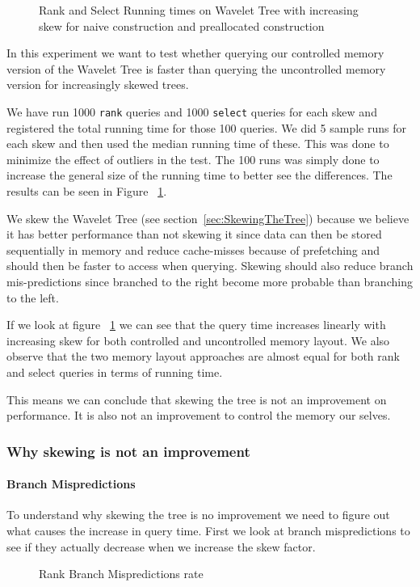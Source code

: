 \begin{figure}
\caption{Rank and Select Running times on Wavelet Tree with increasing skew for naive construction and preallocated construction}
\label{fig:NaiveRankSelectSkewRunningTime}

\end{figure}


In this experiment we want to test whether querying our controlled memory version of the Wavelet Tree is faster than querying the uncontrolled memory version for increasingly skewed trees. 

We have run 1000 \texttt{rank} queries and 1000 \texttt{select} queries for each skew and registered the total running time for those 100 queries. 
We did 5 sample runs for each skew and then used the median running time of these. 
This was done to minimize the effect of outliers in the test. The 100 runs was simply done to increase the general size of the running time to better see the differences. The results can be seen in Figure ~\ref{fig:NaiveRankSelectSkewRunningTime}.

We skew the Wavelet Tree (see section~\ref{sec:SkewingTheTree}) because we believe it has better performance than not skewing it since data can then be stored sequentially in memory and reduce cache-misses because of prefetching and should then be faster to access when querying. 
Skewing should also reduce branch mis-predictions since branched to the right become more probable than branching to the left. 


If we look at figure ~\ref{fig:NaiveRankSelectSkewRunningTime} we can see that the query time increases linearly with increasing skew for both controlled and uncontrolled memory layout. We also observe that the two memory layout approaches are almost equal for both rank and select queries in terms of running time.

This means we can conclude that skewing the tree is not an improvement on performance. It is also not an improvement to control the memory our selves.

\subsubsection{Why skewing is not an improvement}
\paragraph{Branch Mispredictions}
To understand why skewing the tree is no improvement we need to figure out what causes the increase in query time. 
First we look at branch mispredictions to see if they actually decrease when we increase the skew factor. 
\begin{figure}
\caption{Rank Branch Mispredictions rate}
\label{fig:NaiveVsPreallocatedSkewRankQueryBMrate}

\end{figure}

